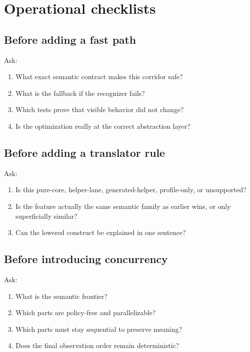 \documentclass[11pt]{article}
\begin{document}
\section{Operational checklists}

\subsection{Before adding a fast path}

Ask:
\begin{enumerate}
    \item What exact semantic contract makes this corridor safe?
    \item What is the fallback if the recognizer fails?
    \item Which tests prove that visible behavior did not change?
    \item Is the optimization really at the correct abstraction layer?
\end{enumerate}

\subsection{Before adding a translator rule}

Ask:
\begin{enumerate}
    \item Is this pure-core, helper-lane, generated-helper, profile-only, or unsupported?
    \item Is the feature actually the same semantic family as earlier wins, or only superficially similar?
    \item Can the lowered construct be explained in one sentence?
\end{enumerate}

\subsection{Before introducing concurrency}

Ask:
\begin{enumerate}
    \item What is the semantic frontier?
    \item Which parts are policy-free and parallelizable?
    \item Which parts must stay sequential to preserve meaning?
    \item Does the final observation order remain deterministic?
\end{enumerate}
\end{document}
